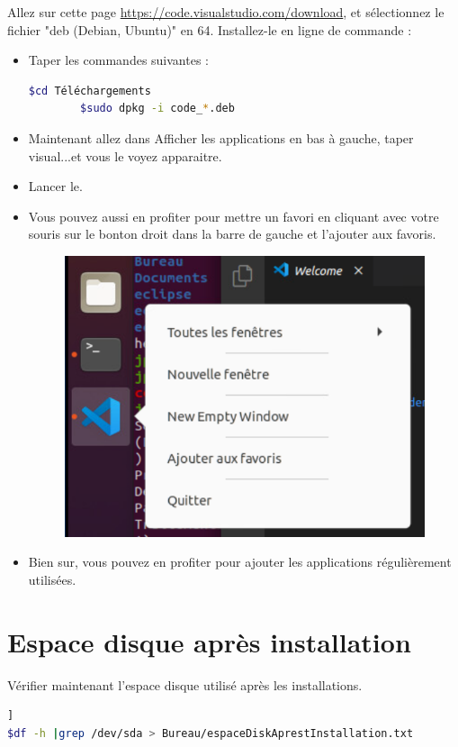 	Allez sur cette page \url{https://code.visualstudio.com/download}, et sélectionnez le fichier "deb (Debian, Ubuntu)" en 64. Installez-le en ligne de commande :
	\begin{itemize}
		\item Taper les commandes suivantes :
		
		\begin{lstlisting}[language=bash]  
		$cd Téléchargements
		$sudo dpkg -i code_*.deb
		\end{lstlisting}
		
		\item Maintenant allez dans Afficher les applications en bas à gauche, taper visual...et vous le voyez apparaitre.
		
		\item Lancer le.
		\item Vous pouvez aussi en profiter pour mettre un favori en cliquant  avec votre souris sur le bonton droit dans la barre de gauche et l'ajouter aux favoris.
		
		
		
		
		\begin{figure}[!htb]
			\centering
			\includegraphics[scale=0.8]{images/capture13}
		\end{figure}
		\item Bien sur, vous pouvez en profiter pour ajouter les applications régulièrement utilisées.


		
	\end{itemize}
	
\section{Espace disque après installation}
Vérifier maintenant l'espace disque utilisé après les installations.
\begin{lstlisting}[language=bash]   ]
$df -h |grep /dev/sda > Bureau/espaceDiskAprestInstallation.txt
\end{lstlisting}

